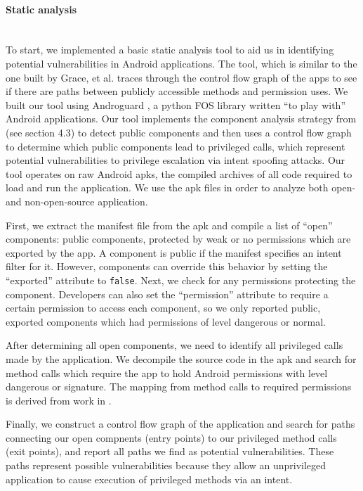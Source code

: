 \documentclass[12pt,a4paper]{article}
\begin{document}
\paragraph{Static analysis} ~\\

To start, we implemented a basic static analysis tool to aid us in identifying
potential vulnerabilities in Android applications. The tool, which is similar to
the one built by Grace, et al. \cite{grace_systematic_2012} traces through the
control flow graph of the apps to see if there are paths between publicly
accessible methods and permission uses. We built our tool using
Androguard \cite{androguard}, a python FOS library written ``to play with''
Android applications. Our tool implements the component analysis strategy from
\cite{chin_analyzing_2011} (see section 4.3) to detect public components and
then uses a control flow graph to determine which public components lead to
privileged calls, which represent potential vulnerabilities to privilege
escalation via intent spoofing attacks. Our tool operates on raw Android apks,
the compiled archives of all code required to load and run the application. We
use the apk files in order to analyze both open- and non-open-source
application.

First, we extract the manifest file from the apk and compile a list of ``open''
components: public components, protected by weak or no permissions which are
exported by the app. A component is public if the manifest specifies an intent
filter for it. However, components can override this behavior by setting the
``exported'' attribute to \texttt{false}. Next, we check for any permissions
protecting the component. Developers can also set the ``permission'' attribute
to require a certain permission to access each component, so we only reported
public, exported components which had permissions of level dangerous or normal.

After determining all open components, we need to identify all privileged calls
made by the application. We decompile the source code in the apk and search for
method calls which require the app to hold Android permissions with level
dangerous or signature. The mapping from method calls to required permissions is
derived from work in \cite{lu_chex_2012}.

Finally, we construct a control flow graph of the application and search for
paths connecting our open compnents (entry points) to our privileged method
calls (exit points), and report all paths we find as potential
vulnerabilities. These paths represent possible vulnerabilities because they
allow an unprivileged application to cause execution of privileged methods via
an intent.
\end{document}
